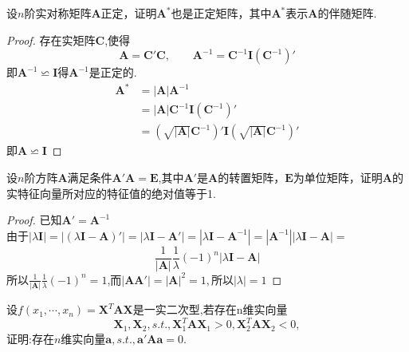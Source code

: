 \documentclass[lang=cn,11pt,normal]{elegantbook}
\begin{document}
	\begin{exercise}
		设$n$阶实对称矩阵$\boldsymbol{A}$正定，证明$\boldsymbol{A}^*$也是正定矩阵，其中$\boldsymbol{A}^*$表示$\boldsymbol{A}$的伴随矩阵.
	\end{exercise}
	\begin{proof}
		存在实矩阵$\boldsymbol{C}$,使得
		$$\boldsymbol{A}=\boldsymbol{C}'\boldsymbol{C},\qquad\boldsymbol{A}^{-1}=\boldsymbol{C}^{-1}\boldsymbol{I}(\boldsymbol{C}^{-1})'
		$$
		即$\boldsymbol{A}^{-1}\backsimeq\boldsymbol{I}$得$\boldsymbol{A}^{-1}$是正定的.\\
		$$
		\begin{aligned}
		\boldsymbol{A}^*&=|\boldsymbol{A}|\boldsymbol{A}^{-1}\\
		&=|\boldsymbol{A}|\boldsymbol{C}^{-1}\boldsymbol{I}(\boldsymbol{C}^{-1})'\\
		&=(\sqrt{|\boldsymbol{A}|}\boldsymbol{C}^{-1})'\boldsymbol{I}(\sqrt{|\boldsymbol{A}|}\boldsymbol{C}^{-1})'
		\end{aligned}
		$$
		即$\boldsymbol{A}\backsimeq\boldsymbol{I}$
	\end{proof}
	\begin{exercise}
		设$n$阶方阵$\boldsymbol{A}$满足条件$\boldsymbol{A}'\boldsymbol{A}=\boldsymbol{E}$,其中$\boldsymbol{A}'$是$\boldsymbol{A}$的转置矩阵，$\boldsymbol{E}$为单位矩阵，证明$\boldsymbol{A}$的实特征向量所对应的特征值的绝对值等于1.
	\end{exercise}
	\begin{proof}
		已知$\boldsymbol{A}'=\boldsymbol{A}^{-1}$\\
		由于$|\lambda\boldsymbol{I}|=|(\lambda\boldsymbol{I}-\boldsymbol{A})'|=|\lambda\boldsymbol{I}-\boldsymbol{A}'|=|\lambda\boldsymbol{I}-\boldsymbol{A}^{-1}|=|\boldsymbol{A}^{-1}||\lambda\boldsymbol{I}-\boldsymbol{A}|=$
		$$
		\frac{1}{|\boldsymbol{A}|}\frac{1}{\lambda}(-1)^n|\lambda\boldsymbol{I}-\boldsymbol{A}|
		$$
		所以$\frac{1}{|\boldsymbol{A}|}\frac{1}{\lambda}(-1)^n=1$,而$|\boldsymbol{AA}'|=|\boldsymbol{A}|^2=1,$所以$|\lambda|=1$
	\end{proof}
	\begin{exercise}
		设$f(x_1,\cdots,x_n)=\boldsymbol{X}^T\boldsymbol{AX}$是一实二次型,若存在n维实向量
		$$
		\boldsymbol{X}_1,\boldsymbol{X}_2,s.t.,\boldsymbol{X}_1^T\boldsymbol{AX}_1>0,\boldsymbol{X}_2^T\boldsymbol{AX}_2<0,
		$$
		证明:存在$n$维实向量$\boldsymbol{a},s.t.,\boldsymbol{a}'\boldsymbol{A}\boldsymbol{a}=0.$
	\end{exercise}
\end{document}
